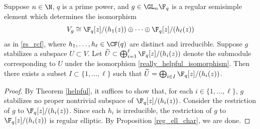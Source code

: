 \begin{corollary}
\label{really_helpful}
Suppose \(n \in \N\), \(q\) is a prime power, and \(g \in \GL_n \F_q\) is a regular semisimple element which determines the isomorphism
\begin{equation}
\label{really_helpful_isomorphism}
V_g
\cong
\F_q[z] / (h_1 (z)) \oplus \cdots \oplus \F_q[z] / (h_\ell (z))
\end{equation}
as in \eqref{rs_rcf}, where $h_1,\ldots,h_\ell \in \CF(q)$ are distinct and irreducible.
Suppose $g$ stabilizes a subspace $U \subset V$.
Let \(\widetilde{U} \subset \bigoplus_{i=1}^{\ell} \F_q[z] / (h_i(z))\) denote the submodule corresponding to \(U\) under the isomorphism \eqref{really_helpful_isomorphism}.
Then there exists a subset \(I \subset \{1,\ldots,\ell\}\) such that \(\widetilde{U} = \bigoplus_{i \in I} \F_q[z]/(h_i(z))\).
\end{corollary}

\begin{proof}
By Theorem \ref{helpful}, it suffices to show that, for each \(i \in \{1,\ldots,\ell\}\), \(g\) stabilizes no proper nontrivial subspace of $\F_q[z]/(h_i(z))$.
Consider the restriction of \(g\) to \(\F_q[z]/(h_i(z))\).
Since each $h_i$ is irreducible, the restriction of $g$ to $\F_q[z] / (h_i(z))$ is regular elliptic. By Proposition \ref{reg_ell_char}, we are done.
\end{proof}
























































